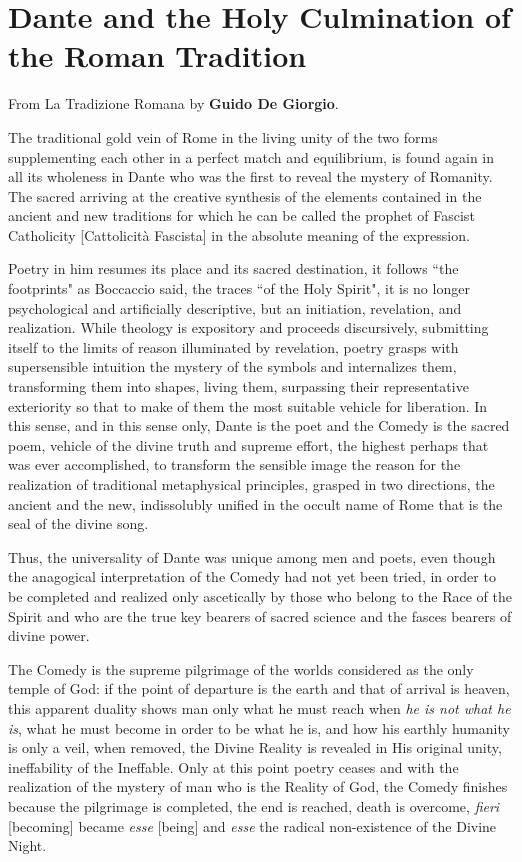 \section{Dante and the Holy Culmination of the Roman Tradition}

\begin{quotex}
From La Tradizione Romana by \textbf{Guido De Giorgio}. 

\end{quotex}
The traditional gold vein of Rome in the living unity of the two forms supplementing each other in a perfect match and equilibrium, is found again in all its wholeness in Dante who was the first to reveal the mystery of Romanity. The sacred arriving at the creative synthesis of the elements contained in the ancient and new traditions for which he can be called the prophet of Fascist Catholicity [Cattolicità Fascista] in the absolute meaning of the expression.

Poetry in him resumes its place and its sacred destination, it follows ``the footprints" as Boccaccio said, the traces ``of the Holy Spirit", it is no longer psychological and artificially descriptive, but an initiation, revelation, and realization. While theology is expository and proceeds discursively, submitting itself to the limits of reason illuminated by revelation, poetry grasps with supersensible intuition the mystery of the symbols and internalizes them, transforming them into shapes, living them, surpassing their representative exteriority so that to make of them the most suitable vehicle for liberation. In this sense, and in this sense only, Dante is the poet and the Comedy is the sacred poem, vehicle of the divine truth and supreme effort, the highest perhaps that was ever accomplished, to transform the sensible image the reason for the realization of traditional metaphysical principles, grasped in two directions, the ancient and the new, indissolubly unified in the occult name of Rome that is the seal of the divine song.

Thus, the universality of Dante was unique among men and poets, even though the anagogical interpretation of the Comedy had not yet been tried, in order to be completed and realized only ascetically by those who belong to the Race of the Spirit and who are the true key bearers of sacred science and the fasces bearers of divine power.

The Comedy is the supreme pilgrimage of the worlds considered as the only temple of God: if the point of departure is the earth and that of arrival is heaven, this apparent duality shows man only what he must reach when \emph{he is not what he is}, what he must become in order to be what he is, and how his earthly humanity is only a veil, when removed, the Divine Reality is revealed in His original unity, ineffability of the Ineffable. Only at this point poetry ceases and with the realization of the mystery of man who is the Reality of God, the Comedy finishes because the pilgrimage is completed, the end is reached, death is overcome, \emph{fieri} [becoming] became \emph{esse} [being] and \emph{esse} the radical non-existence of the Divine Night.



